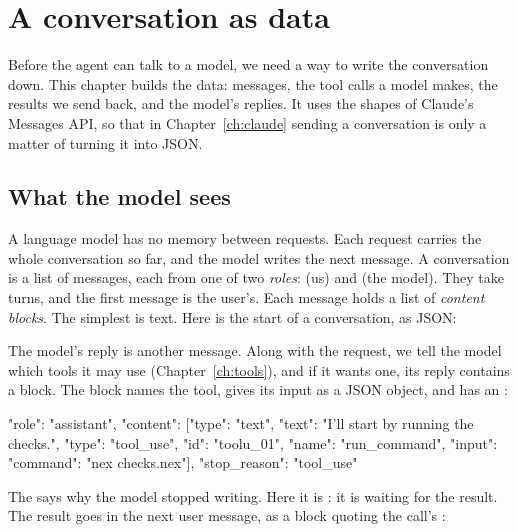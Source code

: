 \chapter{A conversation as data}\label{ch:conversation}

Before the agent can talk to a model, we need a way to write the
conversation down. This chapter builds the data: messages, the tool calls
a model makes, the results we send back, and the model's replies. It uses
the shapes of Claude's Messages API, so that in Chapter~\ref{ch:claude}
sending a conversation is only a matter of turning it into JSON.

\section{What the model sees}

A language model has no memory between requests. Each request carries the
whole conversation so far, and the model writes the next message. A
conversation is a list of messages, each from one of two \emph{roles}:
 (us) and  (the model). They take turns,
and the first message is the user's. Each message holds a list of
\emph{content blocks}. The simplest is text. Here is the start of a
conversation, as JSON:

\begin{json}
\end{json}

The model's reply is another message. Along with the request, we tell the
model which tools it may use (Chapter~\ref{ch:tools}), and if it wants one,
its reply contains a  block. The block names the tool,
gives its input as a JSON object, and has an :

\begin{json}
{"role": "assistant",
 "content": [{"type": "text", "text": "I'll start by running the checks."},
             {"type": "tool_use", "id": "toolu_01", "name": "run_command",
              "input": {"command": "nex checks.nex"}}],
 "stop_reason": "tool_use"}
\end{json}

The  says why the model stopped writing. Here it is
: it is waiting for the result. The result goes in the
next user message, as a  block quoting the call's
:

